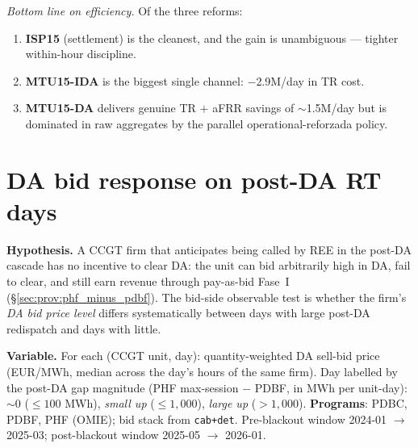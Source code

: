 \documentclass[11pt,a4paper]{article}
\begin{document}
\textit{Bottom line on efficiency.} Of the three reforms:
\begin{enumerate}\setlength{\itemsep}{1pt}
\item \textbf{ISP15} (settlement) is the cleanest, and the gain is unambiguous --- tighter within-hour discipline.
\item \textbf{MTU15-IDA} is the biggest single channel: $-$\texteuro 2.9M/day in TR cost.
\item \textbf{MTU15-DA} delivers genuine TR $+$ aFRR savings of $\sim$\texteuro 1.5M/day but is dominated in raw aggregates by the parallel operational-reforzada policy.
\end{enumerate}


\section{DA bid response on post-DA RT days}\label{sec:prov:bid_vs_rt2}

\textbf{Hypothesis.} A CCGT firm that anticipates being called by REE in the post-DA cascade has no incentive to clear DA: the unit can bid arbitrarily high in DA, fail to clear, and still earn revenue through pay-as-bid Fase~I (\S\ref{sec:prov:phf_minus_pdbf}). The bid-side observable test is whether the firm's \emph{DA bid price level} differs systematically between days with large post-DA redispatch and days with little.

\textbf{Variable.} For each (CCGT unit, day): quantity-weighted DA sell-bid price (EUR/MWh, median across the day's hours of the same firm). Day labelled by the post-DA gap magnitude (PHF max-session $-$ PDBF, in MWh per unit-day): \emph{$\sim 0$} ($\le 100$ MWh), \emph{small up} ($\le 1{,}000$), \emph{large up} ($> 1{,}000$). \textbf{Programs}: PDBC, PDBF, PHF (OMIE); bid stack from \texttt{cab+det}. Pre-blackout window 2024-01 $\to$ 2025-03; post-blackout window 2025-05 $\to$ 2026-01.
\end{document}
